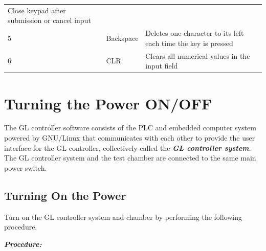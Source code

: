 \begin{longtable}[]{@{}lll@{}}
\begin{minipage}[t]{0.59\columnwidth}
Close keypad after submission or cancel input\strut
\end{minipage}\tabularnewline
\begin{minipage}[t]{0.07\columnwidth}\raggedright
5\strut
\end{minipage} & \begin{minipage}[t]{0.26\columnwidth}\raggedright
Backspace\strut
\end{minipage} & \begin{minipage}[t]{0.59\columnwidth}\raggedright
Deletes one character to its left each time the key is pressed\strut
\end{minipage}\tabularnewline
\begin{minipage}[t]{0.07\columnwidth}\raggedright
6\strut
\end{minipage} & \begin{minipage}[t]{0.26\columnwidth}\raggedright
CLR\strut
\end{minipage} & \begin{minipage}[t]{0.59\columnwidth}\raggedright
Clears all numerical values in the input field\strut
\end{minipage}\tabularnewline
\bottomrule
\end{longtable}


\section{Turning the Power
ON/OFF}

The GL controller software consists of the PLC and embedded computer
system powered by GNU/Linux that communicates with each other to provide
the user interface for the GL controller, collectively called the
\emph{\textbf{GL controller system}}. The GL controller system and the
test chamber are connected to the same main power switch.


\subsection{Turning On the Power}

Turn on the GL controller system and chamber by performing the following
procedure.

\emph{\textbf{Procedure:}}

